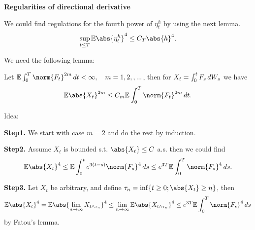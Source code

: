 \textbf{Regularities of directional derivative}
\begin{lem}
We could find regulations for the fourth power of $\eta_t^h$ by using the next lemma.
\begin{equation*}
    \sup_{t\leq T} \E\abs{\eta_t^h}^4 \leq C_T \abs{h}^4.
\end{equation*}
\end{lem}We need the following lemma:
\begin{lem}
Let $\E\int_0^T \norm{F_t}^{2m} \diff t < \infty, \quad m = 1,2,,...$, then for $X_t = \int_0^t F_s \mathop{}\!d W_s$ we have
\begin{equation*}
\E\abs{X_t}^{2m} \leq C_m \E\int_0^T \norm{F_t}^{2m} \diff t.
\end{equation*}
\end{lem}

\pf Idea:

\textbf{Step1.} We start with case $m=2$ and do the rest by induction.

\textbf{Step2.} Assume $X_t$ is bounded s.t. $\abs{X_t} \leq C$ a.s. then we could find
\begin{equation*}
    \E\abs{X_t}^4 \leq \E\int_0^t e^{3(t-s)} \norm{ F_s}^4 \diff s \leq e^{3T} \E\int_0^T\norm{ F_s}^4 \diff s.
\end{equation*}

\textbf{Step3.} Let $X_t$ be arbitrary, and define $\tau_n = \inf\{t\geq 0; \abs{X_t}\geq n\}$, then
\begin{equation*}
    \E\abs{X_t}^4  = \E\abs{\biglim{n\rightarrow \infty} X_{t\wedge \tau_n}}^4 \leq \biglim{n\rightarrow \infty} \E\abs{ X_{t\wedge \tau_n}}^4 \leq e^{3T} \E\int_0^T\norm{ F_s}^4 \diff s
\end{equation*} by Fatou's lemma.

